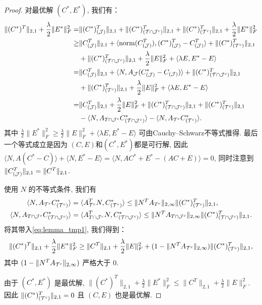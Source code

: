 \begin{proof}
  对最优解 \((C^{*},E^{*})\), 我们有：
  \begin{align}
    \|(C^*)^T\|_{2,1}+\frac{\lambda}{2}\|E^*\|_F^2 =& \|(C^*)^T_{(\mathcal{J})}\|_{2,1}+\|(C^*)^T_{(\mathcal{T}\cap \mathcal{J}^c)}\|_{2,1}+
    \|(C^*)^T_{(\mathcal{T}^c)}\|_{2,1} + \frac{\lambda}{2} \|E^*\|^2_F\nonumber\\
    \geq&\|C^T_{(\mathcal{J})}\|_{2,1}+\langle \operatorname{norm}(C^T_{(\mathcal{J})}),(C^*)^T_{(\mathcal{J})}-C^T_{(\mathcal{J})}
    \rangle+\|(C^*)^T_{(\mathcal{T}^c)}\|_{2,1}\nonumber \\
    &+\|(C^*)^T_{(\mathcal{T}\cap \mathcal{J}^c)}\|_{2,1}+\frac{\lambda}{2} \|E\|^2_F +\langle
    \lambda E,E^*-E\rangle\nonumber\\
    =&\|C^T_{(\mathcal{J})}\|_{2,1}+\langle N,A_{\mathcal{J}}(C^*_{(\mathcal{J})}-C_{(\mathcal{J})})\rangle
     +\|(C^*)^T_{(\mathcal{T}\cap\mathcal{J}^c)}\|_{2,1}\nonumber\\
     &+\|(C^*)^T_{(\mathcal{T}^c)}\|_{2,1} + \frac{\lambda}{2} \|E\|^2_F +\langle
    \lambda E,E^*-E\rangle\nonumber\\
    =&\|C^T_{(\mathcal{J})}\|_{2,1}+\frac{\lambda}{2} \|E\|_F^2+ \|(C^*)^T_{(\mathcal{T}\cap
    \mathcal{J}^c)}\|_{2,1}+\|(C^*)^T_{(\mathcal{T}^c)}\|_{2,1}\nonumber\\
    &-\langle N,A_{T\cap \mathcal{J}^c}C^*_{(\mathcal{T}\cap \mathcal{J}^c)}\rangle
    -\langle N,A_{\mathcal{T}^c}C^*_{(\mathcal{T}^c)}\rangle.
    \label{eq:lemma_tmp1}
  \end{align}
  其中 \(\frac{\lambda}{2} \|E^*\|_F^2 \geq \frac{\lambda}{2} \|E\|_F^2 +\langle
  \lambda E,E^*-E\rangle\) 可由Cauchy–Schwarz不等式推得.
  最后一个等式成立是因为 \((C,E)\)和\((C^*,E^*)\)都是可行解, 因此\(\langle
  N,A(C^*-C)\rangle+\langle N,E^*-E\rangle = \langle
  N,AC^*+E^*-(AC+E)\rangle=0\), 同时注意到 \(\| C^T_{(\mathcal{J})}\|_{2, 1} = \|C^T\|_{2, 1}\).

  使用 \(N\) 的不等式条件, 我们有
  \begin{align*}
    \langle N,A_{\mathcal{T}^c}C^*_{(\mathcal{T}^c)}\rangle&= \langle A_{\mathcal{T}^c}^TN,C^*_{(\mathcal{T}^c)}\rangle
    \leq \|N^T
    A_{T^{c}}\|_{2,\infty}\|(C^*)^T_{(\mathcal{T}^c)}\|_{2,1}, \\
    \langle N,A_{T\cap \mathcal{J}^c}C^*_{(\mathcal{T}\cap \mathcal{J}^c)}\rangle&= 
    \langle A_{T\cap \mathcal{J}^c}^TN,C^*_{(\mathcal{T}\cap \mathcal{J}^c)}\rangle
    \leq \|N^T A_{T\cap \mathcal{J}^{c}}\|_{2,\infty}\|(C^*)^T_{(\mathcal{T}\cap
    \mathcal{J}^c)}\|_{2,1}. 
  \end{align*}
  将其带入\eqref{eq:lemma_tmp1},   我们得到：
  \begin{equation*}
    \|(C^*)^T\|_{2,1}+\frac{\lambda}{2} \|E^*\|^2_F \geq \|C^T\|_{2,1}+ \frac{\lambda}{2} 
    \|E\|_F^2 +(1-\|N^T A_{\mathcal{T}^c}\|_{2, \infty})\|(C^*)^T_{(\mathcal{T}^c)}\|_{2,1},
  \end{equation*}
  其中 \((1-\|N^T A_{\mathcal{T}^c}\|_{2, \infty})\) 严格大于 \(0\).

  由于 \((C^*,E^*)\) 是最优解, \(\|(C^*)^T\|_{2,1}+\frac{\lambda}{2}
  \|E^*\|_F^2\leq \|C^T\|_{2, 1}+\frac{\lambda}{2} \|E\|_F^2\). 
  因此 \(\|(C^*)^T_{(\mathcal{T}^c)}\|_{2,1}=0\) 且 \((C,E)\) 也是最优解.
\end{proof}

